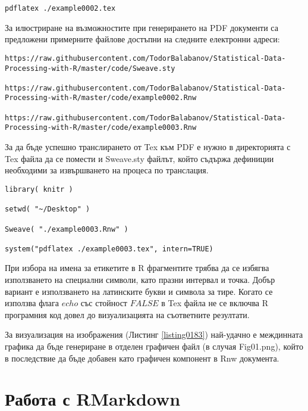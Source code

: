 \begin{lstlisting}[caption=Транслиране от Tex до PDF, label=listing0181]
pdflatex ./example0002.tex
\end{lstlisting}

За илюстриране на възможностите при генерирането на PDF документи са предложени примерните файлове достъпни на следните електронни адреси:

\begin{lstlisting}[caption=Адрес на примерени LaTeX документи, label=listing0182]
https://raw.githubusercontent.com/TodorBalabanov/Statistical-Data-Processing-with-R/master/code/Sweave.sty

https://raw.githubusercontent.com/TodorBalabanov/Statistical-Data-Processing-with-R/master/code/example0002.Rnw

https://raw.githubusercontent.com/TodorBalabanov/Statistical-Data-Processing-with-R/master/code/example0003.Rnw
\end{lstlisting}

За да бъде успешно транслирането от Tex към PDF е нужно в директорията с Tex файла да се помести и Sweave.sty файлът, който съдържа дефиниции необходими за извършването на процеса по транслация. 

\begin{lstlisting}[caption=Линейна регресия на разходи спрямо спестявания, label=listing0183]
library( knitr )

setwd( "~/Desktop" )

Sweave( "./example0003.Rnw" )

system("pdflatex ./example0003.tex", intern=TRUE)
\end{lstlisting}

При избора на имена за етикетите в R фрагментите трябва да се избягва използването на специални символи, като празни интервал и точка. Добър вариант е използването на латинските букви и символа за тире. Когато се използва флага $echo$ със стойност $FALSE$ в Tex файла не се включва R програмния код довел до визуализацията на съответните резултати. 

За визуализация на изображения (Листинг \ref{listing0183}) най-удачно е междинната графика да бъде генериране в отделен графичен файл (в случая Fig01.png), който в последствие да бъде добавен като графичен компонент в Rnw документа.

\section{Работа с RMarkdown}

